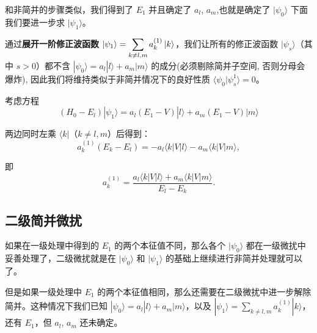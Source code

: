 和非简并的步骤类似，我们得到了 $E_1$ 并且确定了 $a_l$, $a_m$,也就是确定了 $|\psi_0\rangle$ 下面我们要进一步求 $|\psi_1\rangle$。

通过\textbf{展开一阶修正波函数} $\displaystyle \ket{\psi _1}  = \sum\limits_{k \ne l,m} {a_k^{(1)}} \ket{k} $，我们让所有的修正波函数 $|\psi_s\rangle$（其中 $s>0$）都不含 $|\psi_0\rangle = a_l |l\rangle + a_m |m\rangle$ 的成分(必须剔除简并子空间, 否则分母会爆炸), 因此我们将维持类似于非简并情况下的良好性质 $\langle\psi_0|\psi_s^1\rangle=0$。

考虑方程 
\[(H_0 - E_l)|\psi_1\rangle = a_l (E_1 - V)|l\rangle + a_m (E_1 - V)|m\rangle\]

两边同时左乘 $\langle k|$（$k \neq l,m$）后得到：
\begin{equation}
	a_k^{(1)}(E_k - E_l) = -a_l\langle k|V|l\rangle - a_m\langle k|V|m\rangle,
\end{equation}

即
\begin{equation}
	a_k^{(1)} = \frac{a_l\langle k|V|l\rangle + a_m\langle k|V|m\rangle}{E_l - E_k}.
\end{equation}

\subsection{二级简并微扰}
如果在一级处理中得到的 $E_1$ 的两个本征值不同，那么各个 $|\psi_0\rangle$ 都在一级微扰中妥善处理了，二级微扰就是在 $|\psi_0\rangle$ 和 $|\psi_1\rangle$ 的基础上继续进行非简并处理就可以了。

但是如果一级处理中 $E_1$ 的两个本征值相同，那么还需要在二级微扰中进一步解除简并。这种情况下我们已知 $|\psi_0\rangle = a_l|l\rangle + a_m|m\rangle$，以及 $|\psi_1\rangle = \sum_{k \neq l,m} a_k^{(1)}|k\rangle$，还有 $E_1$，但 $a_l$, $a_m$ 还未确定。


